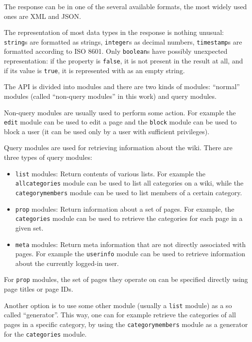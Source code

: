 The response can be in one of the several available formats, the most widely used ones are XML and JSON.

The representation of most data types in the response is nothing unusual:
\texttt{string}s are formatted as strings, \texttt{integer}s as decimal numbers,
\texttt{timestamp}s are formatted according to ISO 8601.
Only \texttt{boolean}s have possibly unexpected representation:
if the property is \texttt{false}, it is not present in the result at all,
and if its value is \texttt{true}, it is represented with as an empty string.

The API is divided into modules and there are two kinds of modules:
``normal'' modules (called ``non-query modules'' in this work) and query modules.

Non-query modules are usually used to perform some action.
For example the \texttt{edit} module can be used to edit a page
and the \texttt{block} module can be used to block a user (it can be used only by a user with sufficient privileges).

Query modules are used for retrieving information about the wiki. There are three types of query modules:

\begin{itemize}
\item \texttt{list} modules: Return contents of various lists.
For example the \texttt{allcategories} module can be used to list all categories on a wiki,
while the \texttt{categorymembers} module can be used to list members of a certain category.
\item \texttt{prop} modules: Return information about a set of pages.
For example, the \texttt{categories} module can be used to retrieve the categories for each page in a given set.
\item \texttt{meta} modules: Return meta information that are not directly associated with pages.
For example the \texttt{userinfo} module can be used to retrieve information about the currently logged-in user.
\end{itemize}

For \texttt{prop} modules, the set of pages they operate on can be specified directly using page titles or page IDs.

Another option is to use some other module (usually a \texttt{list} module) as a so called ``generator''.
This way, one can for example retrieve the categories of all pages in a specific category,
by using the \texttt{categorymembers} module as a generator for the \texttt{categories} module.

